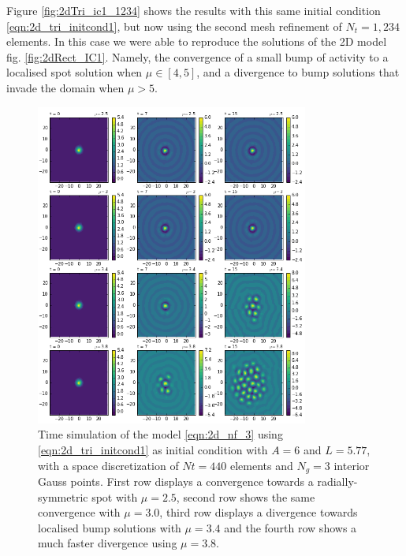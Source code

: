 \documentclass{uonmathreport}
\begin{document}
Figure \ref{fig:2dTri_ic1_1234} shows the results with this same initial condition \ref{eqn:2d_tri_initcond1}, but now using the second mesh refinement of $N_t=1,234$ elements. In this case we were able to reproduce the solutions of the 2D model fig. \ref{fig:2dRect_IC1}. Namely, the convergence of a small bump of activity to a localised spot solution when $\mu \in [4,5]$, and a divergence to bump solutions that invade the domain when $\mu > 5$.

\begin{figure}[H]
	\begin{center}
		\includegraphics[width=0.8\textwidth]{Figures/2dTri_IC1_440elems.png}
	\end{center}
	\caption{Time simulation of the model \ref{eqn:2d_nf_3} using \ref{eqn:2d_tri_initcond1} as initial condition with $A=6$ and $L=5.77$, with a space discretization of $Nt=440$ elements and $N_g=3$ interior Gauss points. First row displays a convergence towards a radially-symmetric spot with $\mu=2.5$, second row shows the same convergence with $\mu=3.0$, third row displays a divergence towards localised bump solutions with $\mu=3.4$ and the fourth row shows a much faster divergence using $\mu = 3.8$.}
	\label{fig:2dTri_ic1_440}
\end{figure}
\end{document}
